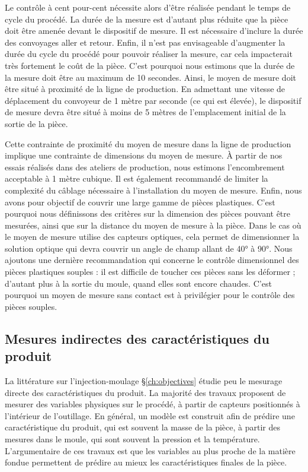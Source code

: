 Le contrôle à cent pour-cent nécessite alors d'être réalisée pendant le temps de cycle du procédé.
La durée de la mesure est d'autant plus réduite que la pièce doit être amenée devant le dispositif de mesure.
Il est nécessaire d'inclure la durée des convoyages aller et retour.
Enfin, il n'est pas envisageable d'augmenter la durée du cycle du procédé pour pouvoir réaliser la mesure, car cela impacterait très fortement le coût de la pièce.
C'est pourquoi nous estimons que la durée de la mesure doit être au maximum de 10 secondes.
%
Ainsi, le moyen de mesure doit être situé à proximité de la ligne de production.
En admettant une vitesse de déplacement du convoyeur de 1 mètre par seconde (ce qui est élevée), le dispositif de mesure devra être situé à moins de 5 mètres de l'emplacement initial de la sortie de la pièce.
%

Cette contrainte de proximité du moyen de mesure dans la ligne de production implique une contrainte de dimensions du moyen de mesure.
À partir de nos essais réalisés dans des ateliers de production, nous estimons l'encombrement acceptable à 1 mètre cubique.
Il est également recommandé de limiter la complexité du câblage nécessaire à l'installation du moyen de mesure.
%
Enfin, nous avons pour objectif de couvrir une large gamme de pièces plastiques.
C'est pourquoi nous définissons des critères sur la dimension des pièces pouvant être mesurées, ainsi que sur la distance du moyen de mesure à la pièce.
Dans le cas où le moyen de mesure utilise des capteurs optiques, cela permet de dimensionner la solution optique qui devra couvrir un angle de champ allant de 40° à 90°.
%
Nous ajoutons une dernière recommandation qui concerne le contrôle dimensionnel des pièces plastiques souples : il est difficile de toucher ces pièces sans les déformer ; d'autant plus à la sortie du moule, quand elles sont encore chaudes.
C'est pourquoi un moyen de mesure sans contact est à privilégier pour le contrôle des pièces souples.

\subsection{Mesures indirectes des caractéristiques du produit} \label{subsec:indirect_measures}
La littérature sur l'injection-moulage §\ref{ch:objectives} étudie peu le mesurage directe des caractéristiques du produit.
La majorité des travaux proposent de mesurer des variables physiques sur le procédé, à partir de capteurs positionnés à l'intérieur de l'outillage.
En général, un modèle est construit afin de prédire une caractéristique du produit, qui est souvent la masse de la pièce, à partir des mesures dans le moule, qui sont souvent la pression et la température.
L'argumentaire de ces travaux est que les variables au plus proche de la matière fondue permettent de prédire au mieux les caractéristiques finales de la pièce.

